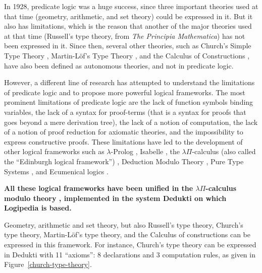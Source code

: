 In 1928, predicate logic was a huge success, since three important
theories used at that time (geometry, arithmetic, and set theory)
could be expressed in it. But it also has limitations, which is the
reason that another of the major theories used at that time (Russell's
type theory, from {\em The Principia Mathematica}) has not been
expressed in it. Since then, several other theories, such as Church's
Simple Type Theory \cite{Church40}, Martin-L\"of's Type Theory
\cite{Martin-Lof84}, and the Calculus of Constructions
\cite{CoquandHuet88}, have also been defined as autonomous theories,
and not in predicate logic.



However, a different line of research has attempted to understand the
limitations of predicate logic and to propose more powerful logical
frameworks.  The most prominent limitations of predicate logic are the
lack of function symbols binding variables, the lack of a syntax for
proof-terms (that is a syntax for proofs that goes beyond a mere
derivation tree), the lack of a notion of computation, the lack of a
notion of proof reduction for axiomatic theories, and the
impossibility to express constructive proofs. These limitations have
led to the development of other logical frameworks such as
$\lambda$-Prolog \cite{MillerNadathur12}, Isabelle \cite{Paulson90},
the $\lambda \Pi$-calculus (also called the ``Edinburgh logical
framework'') \cite{HarperHonsellPlotkin91}, Deduction Modulo Theory
\cite{DowekHardinKirchner03, DowekWerner03}, Pure Type Systems
\cite{Berardi88,Terlouw89}, and Ecumenical logics
\cite{Prawitz15,Dowek15,PereiraRodriguez17}.

{\bf All these logical frameworks have been unified in the $\lambda
\Pi$-calculus modulo theory \cite{CousineauDowek07}, implemented in
the system Dedukti \cite{Assaf16} on which Logipedia is
based.}

Geometry, arithmetic and set theory, but also Russell's type
theory, Church's type theory, Martin-L\"of's type theory, and the
Calculus of constructions can be expressed in this framework.
%
For instance, Church's type theory can be expressed in Dedukti
with 11 ``axioms'': 8 declarations and 3 computation rules, as given
in Figure~\ref{church-type-theory}.

